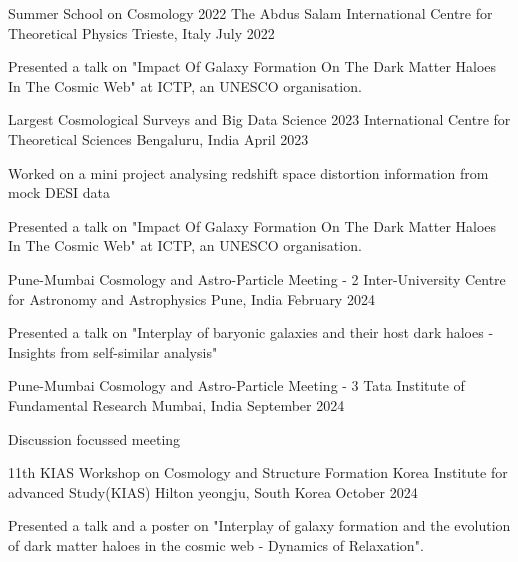 \begin{cventries}

{
\cventry
{Summer School on Cosmology 2022}
{The Abdus Salam International Centre for Theoretical Physics}
{Trieste, Italy}
{July 2022}
{
\begin{cvitems}
\item {Presented a talk on "Impact Of Galaxy Formation On The Dark Matter Haloes In The Cosmic Web" at ICTP, an UNESCO organisation.}
\end{cvitems}
}
}

{
\cventry
{Largest Cosmological Surveys and Big Data Science 2023}
{International Centre for Theoretical Sciences}
{Bengaluru, India}
{April 2023}
{
\begin{cvitems}
\item {Worked on a mini project analysing redshift space distortion information from mock DESI data}
\item {Presented a talk on "Impact Of Galaxy Formation On The Dark Matter Haloes In The Cosmic Web" at ICTP, an UNESCO organisation.}
\end{cvitems}
}
}


{
\cventry
{Pune-Mumbai Cosmology and Astro-Particle Meeting - 2}
{Inter-University Centre for Astronomy and Astrophysics}
{Pune, India}
{February 2024}
{
\begin{cvitems}
\item {Presented a talk on "Interplay of baryonic galaxies and their host dark haloes - Insights from self-similar analysis"}
\end{cvitems}
}
}

{
\cventry
{Pune-Mumbai Cosmology and Astro-Particle Meeting - 3}
{Tata Institute of Fundamental Research}
{Mumbai, India}
{September 2024}
{
\begin{cvitems}
\item {Discussion focussed meeting}
\end{cvitems}
}
}

{
\cventry
{11th KIAS Workshop on Cosmology and Structure Formation}
{Korea Institute for advanced Study(KIAS)}
{Hilton yeongju, South Korea}
{October 2024}
{
\begin{cvitems}
\item {Presented a talk and a poster on "Interplay of galaxy formation and the evolution of dark matter haloes in the cosmic web - Dynamics of Relaxation".}
\end{cvitems}
}
}





\end{cventries}
